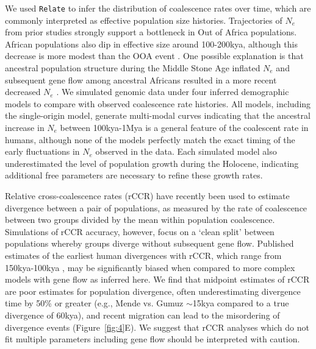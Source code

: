 \documentclass{article}
\begin{document}
We used \texttt{Relate} \citep{Speidel2019-nj} to infer the distribution of
coalescence rates over time, which are commonly interpreted as effective
population size histories. Trajectories of $N_e$ from prior studies strongly
support a bottleneck in Out of Africa populations. African populations also dip
in effective size around 100-200kya, although this decrease is more modest than
the OOA event \citep{Mallick2016-lx}. One possible explanation is that
ancestral population structure during the Middle Stone Age inflated $N_e$ and
subsequent gene flow among ancestral Africans resulted in a more recent
decreased $N_e$ \citep{Mazet2016-wn}.
We simulated genomic data under four inferred demographic models to compare
with observed coalescence rate histories. All models, including the
single-origin model, generate multi-modal curves indicating that the ancestral
increase in $N_e$ between 100kya-1Mya is a general feature of the coalescent
rate in humans, although none of the models perfectly match the exact timing of
the early fluctuations in $N_e$ observed in the data.
Each simulated model also underestimated the level of population growth during
the Holocene, indicating additional free parameters are necessary to refine
these growth rates.

Relative cross-coalescence rates (rCCR) have recently been used to estimate
divergence between a pair of populations, as measured by the rate of
coalescence between two groups divided by the mean within population
coalescence. Simulations of rCCR accuracy, however, focus on a ‘clean split’
between populations whereby groups diverge without subsequent gene flow.
Published estimates of the earliest human divergences with rCCR, which range
from 150kya-100kya \citep{Bergstrom2021-iw}, may be significantly biased when
compared to more complex models with gene flow as inferred here. We find that
midpoint estimates of rCCR are poor estimates for population divergence, often
underestimating divergence time by 50\% or greater (e.g., Mende vs. Gumuz
$\sim$15kya compared to a true divergence of 60kya), and recent migration can
lead to the misordering of divergence events (Figure~\ref{fig:4}E). We suggest
that rCCR analyses which do not fit multiple parameters including gene flow
should be interpreted with caution.
\end{document}
